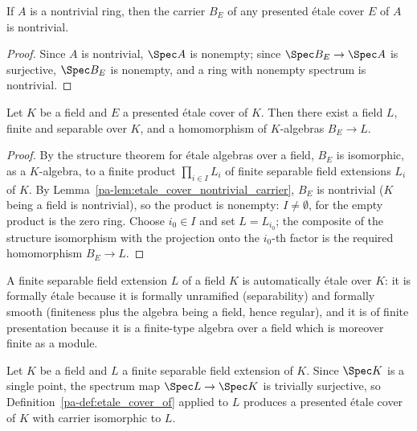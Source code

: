 \begin{lemma}
  \label{pa-lem:etale_cover_nontrivial_carrier}
  \leanok

  If \(A\) is a nontrivial ring, then the carrier \(B_E\) of any presented \'etale cover \(E\)
  of \(A\) is nontrivial.
\end{lemma}
\begin{proof}
  \leanok
  Since \(A\) is nontrivial, \(\Spec A\) is nonempty; since \(\Spec B_E \to \Spec A\) is
  surjective, \(\Spec B_E\) is nonempty, and a ring with nonempty spectrum is nontrivial.
\end{proof}

\begin{theorem}
  \label{pa-thm:etale_cover_field_cofinality}
  \leanok

  Let \(K\) be a field and \(E\) a presented \'etale cover of \(K\). Then there exist a field
  \(L\), finite and separable over \(K\), and a homomorphism of \(K\)-algebras
  \(B_E \to L\).
\end{theorem}
\begin{proof}
  \leanok
  By the structure theorem for \'etale algebras over a field, \(B_E\) is isomorphic, as a
  \(K\)-algebra, to a finite product \(\prod_{i \in I} L_i\) of finite separable field
  extensions \(L_i\) of \(K\). By Lemma~\ref{pa-lem:etale_cover_nontrivial_carrier}, \(B_E\) is
  nontrivial (\(K\) being a field is nontrivial), so the product is nonempty: \(I \neq
  \emptyset\), for the empty product is the zero ring. Choose \(i_0 \in I\) and set
  \(L = L_{i_0}\); the composite of the structure isomorphism with the projection onto the
  \(i_0\)-th factor is the required homomorphism \(B_E \to L\).
\end{proof}

A finite separable field extension \(L\) of a field \(K\) is automatically \'etale over \(K\):
it is formally \'etale because it is formally unramified (separability) and formally smooth
(finiteness plus the algebra being a field, hence regular), and it is of finite presentation
because it is a finite-type algebra over a field which is moreover finite as a module.

\begin{definition}
  \label{pa-def:etale_cover_ofField}
  \leanok

  Let \(K\) be a field and \(L\) a finite separable field extension of \(K\). Since \(\Spec K\)
  is a single point, the spectrum map \(\Spec L \to \Spec K\) is trivially surjective, so
  Definition~\ref{pa-def:etale_cover_of} applied to \(L\) produces a presented \'etale cover of
  \(K\) with carrier isomorphic to \(L\).
\end{definition}

